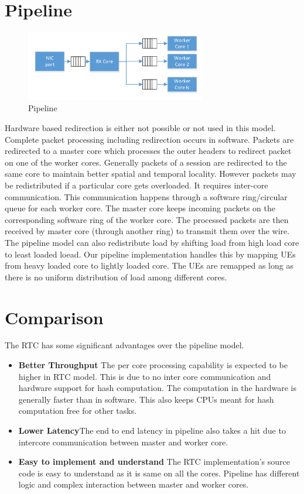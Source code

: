 \section{Pipeline \label{secPipeline}}
\begin{figure}[htbp]
    \centering
    \includegraphics[width=0.7\textwidth, keepaspectratio]{./fig/ModelsofExecution/Pipeline.png}
    \caption{Pipeline}
    \label{figPipeline}
\end{figure}
 Hardware based redirection is either not possible or not used in this model. Complete packet processing including redirection occurs in software. Packets are redirected to a master core which processes the outer headers to redirect packet on one of the worker cores. Generally packets of a session are redirected to the same core to maintain better spatial and temporal locality. However packets may be redistributed if a particular core gets overloaded.
It requires inter-core communication. This communication happens through a software ring/circular queue for each worker core. The master core keeps incoming packets on the corresponding software ring of the worker core. The processed packets are then received by master core (through another ring) to transmit them over the wire.
The pipeline model can also redistribute load by shifting load from high load core to least loaded loead.
Our pipeline implementation handles this by mapping UEs from heavy loaded core to lightly loaded core. The UEs are remapped as long as there is no uniform distribution of load among different cores.
\section{Comparison \label{RTCpipelineComparison}}

The RTC has some significant advantages over the pipeline model.
\begin{itemize}
    \item \textbf{Better Throughput} The per core processing capability is expected to be higher in RTC model. This is due to no inter core communication and
 hardware support for hash computation. The computation in the hardware is generally faster than in software. This also keeps
  CPUs meant for hash computation free for other tasks. 
  \item \textbf{Lower Latency}The end to end latency in pipeline also takes a hit due to intercore
   communication between master and worker core.
\item \textbf{Easy to implement and understand} The RTC implementation's source code is easy to understand as it is same on all the cores. Pipeline has different logic and complex interaction between master and worker cores.
\end{itemize}
 
